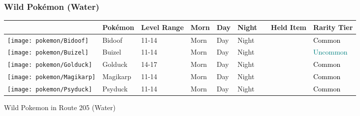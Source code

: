 \subsubsection{Wild Pokémon (Water)}%
\label{ssubsec:WildPokmon(Water)}%
\begin{longtable}{||l l l l l l l l l||}%
\hline%
&Pokémon&Level Range&Morn&Day&Night&&Held Item&Rarity Tier\\%
\hline%
\endhead%
\hline%
\texttt{[image: pokemon/Bidoof]}&Bidoof&11{-}14&Morn&Day&Night&&&\textcolor{black}{%
Common%
}\\%
\hline%
\texttt{[image: pokemon/Buizel]}&Buizel&11{-}14&Morn&Day&Night&&&\textcolor{teal}{%
Uncommon%
}\\%
\hline%
\texttt{[image: pokemon/Golduck]}&Golduck&14{-}17&Morn&Day&Night&&&\textcolor{black}{%
Common%
}\\%
\hline%
\texttt{[image: pokemon/Magikarp]}&Magikarp&11{-}14&Morn&Day&Night&&&\textcolor{black}{%
Common%
}\\%
\hline%
\texttt{[image: pokemon/Psyduck]}&Psyduck&11{-}14&Morn&Day&Night&&&\textcolor{black}{%
Common%
}\\%
\hline%
\end{longtable}%
\caption{Wild Pokemon in Route 205 (Water)}